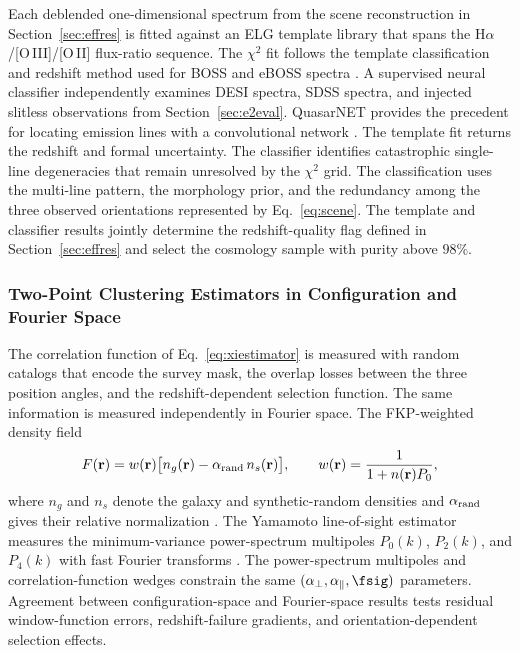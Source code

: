 Each deblended one-dimensional spectrum from the scene reconstruction in Section~\ref{sec:effres} is fitted against an ELG template library that spans the H$\alpha$/[O\,III]/[O\,II] flux-ratio sequence. The $\chi^2$ fit follows the template classification and redshift method used for BOSS and eBOSS spectra \cite{bolton2012}. A supervised neural classifier independently examines DESI spectra, SDSS spectra, and injected slitless observations from Section~\ref{sec:e2eval}. QuasarNET provides the precedent for locating emission lines with a convolutional network \cite{quasarnet2018}. The template fit returns the redshift and formal uncertainty. The classifier identifies catastrophic single-line degeneracies that remain unresolved by the $\chi^2$ grid. The classification uses the multi-line pattern, the morphology prior, and the redundancy among the three observed orientations represented by Eq.~\eqref{eq:scene}. The template and classifier results jointly determine the redshift-quality flag defined in Section~\ref{sec:effres} and select the cosmology sample with purity above $98\%$.

\subsubsection{Two-Point Clustering Estimators in Configuration and Fourier Space}

The correlation function of Eq.~\eqref{eq:xiestimator} is measured with random catalogs that encode the survey mask, the overlap losses between the three position angles, and the redshift-dependent selection function. The same information is measured independently in Fourier space. The FKP-weighted density field
\begin{equation}
  F(\mathbf{r}) = w(\mathbf{r})\big[n_g(\mathbf{r})-\alpha_{\rm rand}\,n_s(\mathbf{r})\big],
  \qquad
  w(\mathbf{r}) = \frac{1}{1+n(\mathbf{r})P_0},
  \label{eq:fkp}
\end{equation}
where $n_g$ and $n_s$ denote the galaxy and synthetic-random densities and $\alpha_{\rm rand}$ gives their relative normalization \cite{fkp1994}. The Yamamoto line-of-sight estimator measures the minimum-variance power-spectrum multipoles $P_0(k)$, $P_2(k)$, and $P_4(k)$ with fast Fourier transforms \cite{yamamoto2006,hand2017nbodykit}. The power-spectrum multipoles and correlation-function wedges constrain the same $(\alpha_\perp,\alpha_\parallel,\fsig)$ parameters. Agreement between configuration-space and Fourier-space results tests residual window-function errors, redshift-failure gradients, and orientation-dependent selection effects.

